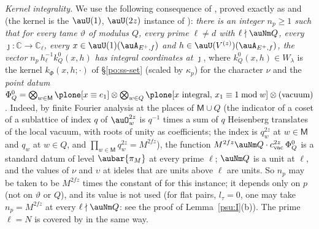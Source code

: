 \documentclass[10pt]{amsart}
\theoremstyle{definition}
\theoremstyle{remark}
\newcommand{\C}{\mathbb C}
\begin{document}
\emph{Kernel integrality.} We use the following consequence of {\cite[Theorem~7.15]{P49}}, proved exactly
as {\cite[Proposition~5.30]{P49}} and {\cite[Corollary~7.16(a)]{P49}} (the kernel is the $\auU(1)$, $\auU(2z)$
instance of {\cite[(34)]{P49}}): \emph{there is an integer $n_p\ge1$ such that for every tame
$\vartheta$ of modulus $Q$, every prime $\ell\ne d$ with $\ell\nmid\auNm Q$, every
$\jmath\colon\C\to\C_\ell$, every $x\in\auU(1)(\auA_{E^+,f})$ and $h\in\auU(V^{(z)})(\auA_{E^+,f})$, the
vector $n_p\,h_\ell^{-1}k^0_Q(x,h)$ has integral coordinates at $\jmath$}, where $k^0_Q(x,h)\in
W_\lambda$ is the kernel $k_{\Phi}(x,h;\cdot)$ of \S\ref{po:ss-set} (scaled by $\kappa_p$) for the
character $\nu$ and the \emph{point datum} $\Phi^0_Q=\bigotimes_{w\in\mathsf M}\plone[x\equiv e_1]
\otimes\bigotimes_{w\in Q}\plone[x\text{ integral},\,x_1\equiv1\bmod w]\otimes(\text{vacuum})$.
Indeed, by finite Fourier analysis at the places of $\mathsf M\cup Q$ (the indicator of a coset of a
sublattice of index $q$ of $\auO_w^{2z}$ is $q^{-1}$ times a sum of $q$ Heisenberg translates of the
local vacuum, with roots of unity as coefficients; the index is $q_w^{2z}$ at $w\in\mathsf M$ and
$q_w$ at $w\in Q$, and $\prod_{w\in\mathsf M}q_w^{2z}=M^{2fz}$), the function $M^{2fz}\auNm Q\cdot
c_{\mathrm{vac}}^{2z}\,\Phi^0_Q$ is a standard datum of level $\aubar{\pi_M}$ at every prime $\ell$;
$\auNm Q$ is a unit at $\ell$, and the values of $\nu$ and $\upsilon$ at ideles
that are units above $\ell$ are units. So $n_p$ may be taken to be $M^{2fz}$ times the constant of
{\cite[Proposition~5.30]{P49}} for this instance; it depends only on $p$
(not on $\vartheta$ or $Q$), and its value is not used (for flat pairs, $l_\tau=0$, one may take
$n_p=M^{2fz}$ at every $\ell\nmid\auNm Q$: see the proof of Lemma~\ref{psu:I}(b)).
The prime $\ell=N$ is covered by {\cite[Corollary~7.16(b)]{P49}} in the same way.
\end{document}
